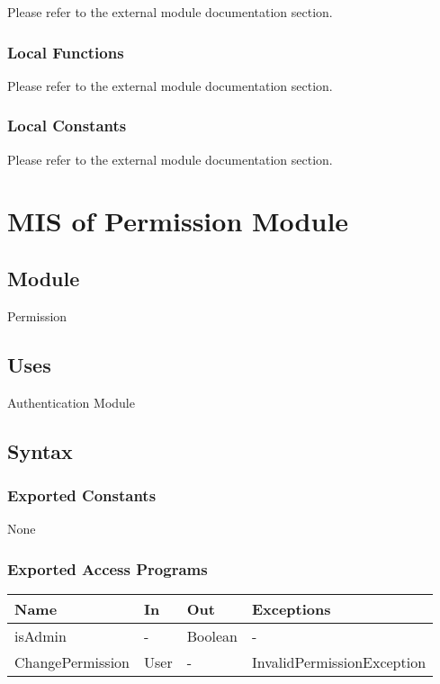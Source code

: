 \documentclass[12pt, titlepage]{article}
\begin{document}
Please refer to the external module documentation section.

\subsubsection{Local Functions}

Please refer to the external module documentation section.

\subsubsection{Local Constants}

Please refer to the external module documentation section.

\newpage

\section{MIS of Permission Module} \label{mPerm}

\subsection{Module}

Permission

\subsection{Uses}

Authentication Module

\subsection{Syntax}

\subsubsection{Exported Constants}

None

\subsubsection{Exported Access Programs}

\begin{center}
	\begin{tabular}{p{4cm} p{2cm} p{4cm} p{4cm}}
	\hline
	\textbf{Name} & \textbf{In} & \textbf{Out} & \textbf{Exceptions} \\
	\hline
	isAdmin & - & Boolean & - \\
	ChangePermission & User & - & InvalidPermissionException \\
	\hline
	\end{tabular}
\end{center}
\end{document}
